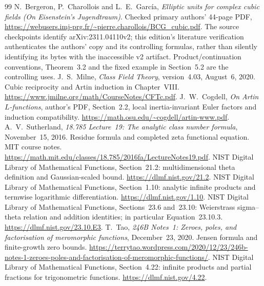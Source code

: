 \begin{thebibliography}{99}
 N.~Bergeron, P.~Charollois and L.~E.~Garc\'ia,
\emph{Elliptic units for complex cubic fields (On Eisenstein's Jugendtraum)}.
Checked primary authors' 44-page PDF, \url{https://webusers.imj-prg.fr/~pierre.charollois/BCG_cubic.pdf}.
The source checkpoints identify arXiv:2311.04110v2; this edition's literature verification authenticates the authors' copy and its controlling formulas, rather than silently identifying its bytes with the inaccessible v2 artifact. Product/continuation conventions, Theorem~3.2 and the fixed example in Section~5.2 are the controlling uses.
 J.~S.~Milne, \emph{Class Field Theory}, version~4.03, August~6, 2020. Cubic reciprocity and Artin induction in Chapter~VIII. \url{https://www.jmilne.org/math/CourseNotes/CFTc.pdf}.
 J.~W.~Cogdell, \emph{On Artin $L$-functions}, author's PDF, Section~2.2, local inertia-invariant Euler factors and induction compatibility. \url{https://math.osu.edu/~cogdell/artin-www.pdf}.
 A.~V.~Sutherland, \emph{18.785 Lecture~19: The analytic class number formula}, November~15, 2016. Residue formula and completed zeta functional equation. MIT course notes. \url{https://math.mit.edu/classes/18.785/2016fa/LectureNotes19.pdf}.
 NIST Digital Library of Mathematical Functions, Section~21.2: multidimensional theta definition and Gaussian-scaled bound. \url{https://dlmf.nist.gov/21.2}.
 NIST Digital Library of Mathematical Functions, Section~1.10: analytic infinite products and termwise logarithmic differentiation. \url{https://dlmf.nist.gov/1.10}.
 NIST Digital Library of Mathematical Functions, Sections~23.6 and~23.10: Weierstrass sigma--theta relation and addition identities; in particular Equation~23.10.3. \url{https://dlmf.nist.gov/23.10.E3}.
 T.~Tao, \emph{246B Notes~1: Zeroes, poles, and factorisation of meromorphic functions}, December~23, 2020. Jensen formula and finite-growth zero bounds. \url{https://terrytao.wordpress.com/2020/12/23/246b-notes-1-zeroes-poles-and-factorisation-of-meromorphic-functions/}.
 NIST Digital Library of Mathematical Functions, Section~4.22: infinite products and partial fractions for trigonometric functions. \url{https://dlmf.nist.gov/4.22}.
\end{thebibliography}
